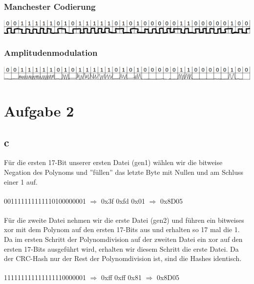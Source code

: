 \documentclass[numbers=noendperiod]{scrartcl}
\begin{document}
\subsubsection*{Manchester Codierung}
\includegraphics[width=1.0\textwidth]{manchester.png}
\subsubsection*{Amplitudenmodulation}
\includegraphics[width=1.0\textwidth]{amplitude.png}
\section*{Aufgabe 2}

\subsection*{c}
Für die ersten 17-Bit unserer ersten Datei (gen1) wählen wir die bitweise Negation des Polynoms und ''füllen'' das letzte Byte mit Nullen und am Schluss einer 1 auf. \\ \\

001111111111110100000001 \(\Rightarrow \) 0x3f 0xfd 0x01 \(\Rightarrow \) 0x8D05 \\ \\
Für die zweite Datei nehmen wir die erste Datei (gen2) und führen ein bitweises xor mit dem Polynom auf den ersten 17-Bits aus und erhalten so 17 mal die 1. Da im ersten Schritt der Polynomdivision auf der zweiten Datei ein xor auf den ersten 17-Bits ausgeführt wird, erhalten wir diesem Schritt die erste Datei. Da der CRC-Hash nur der Rest der Polynomdivision ist, sind die Hashes identisch.\\ \\

111111111111111110000001 \(\Rightarrow \) 0xff 0xff 0x81 \(\Rightarrow \) 0x8D05 \\ \\
\end{document}
